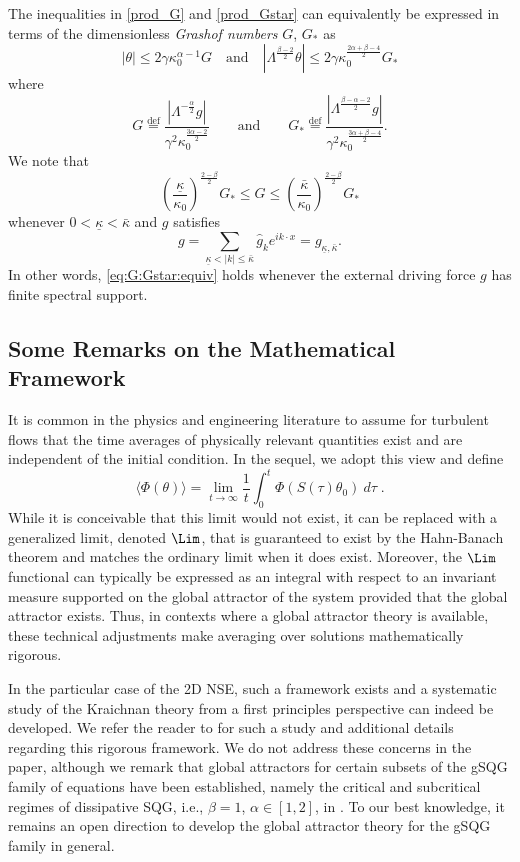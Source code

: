 \documentclass[twoside, reqno]{amsart}
\numberwithin{lemma}{section}
\numberwithin{theorem}{section}
\numberwithin{proposition}{section}
\numberwithin{equation}{section} %
\newcommand{\te}{\theta}
\newcommand{\ga}{\gamma}
\newcommand{\la}{\Lambda}
\newcommand{\bkap}{\bar{\kap}}
\newcommand{\kapb}{\underline{\kap}}
\newcommand{\al}{\alpha}
\newcommand{\be}{\beta}
\newcommand{\kap}{\kappa}
\begin{document}
The inequalities in \eqref{prod_G} and \eqref{prod_Gstar} can {equivalently} be expressed in terms of the dimensionless {\it Grashof numbers} $G$, ${G_*}$ as 
 $$|\te| \leq 2\ga\kappa_0^{\alpha-1}G \quad \text{and}\quad |\la^{\frac{\beta-2}{2}}\te| \leq {2}\ga \kappa_0^{\frac{2\alpha+\beta-4}{2}} G_*$$ where
    \begin{equation} \label{def:G}
        G \overset{\text{def}}{=} \frac{|\la^{-\frac{\alpha}{2}}g|}{\ga^2 \kappa_0^{\frac{3\alpha-2}{2}}} \qquad \text{and} \qquad G_* \overset{\text{def}}{=} \frac{|\la^{\frac{\beta-\alpha-2}{2}}g|}{\ga^2 \kappa_0^{\frac{3\alpha+\beta-4}{2}}} .
    \end{equation}
{We note that}
\begin{equation}\label{eq:G:Gstar:equiv}
    \left(\frac{\kapb}{\kappa_0}\right)^{\frac{2-\beta}{2}}  G_*\leq G \leq \left(\frac{\bkap}{\kappa_0}\right)^{\frac{2-\beta}{2}} G_* 
\end{equation}
whenever $0<\kapb<\bkap$ and $g$ satisfies 
\begin{equation} \label{def:g_kbound}
    g=\sum_{{\kapb} < |k| \leq \bkap} \hat{g}_k e^{ik\cdot x}=g_{\kapb,\bkap}.
\end{equation} 
{In other words, \eqref{eq:G:Gstar:equiv} holds whenever the external driving force $g$ has finite spectral support.}

\subsection{Some Remarks on the Mathematical Framework}
It is common in the physics and engineering literature to assume for turbulent flows that the time averages of physically relevant quantities exist and are independent of the initial condition.   In the sequel, we adopt this view and define 
$$
\langle \Phi(\theta) \rangle = \lim_{t\to \infty} \frac{1}{t} \int_0^t \Phi (S(\tau)\theta_0) \ d\tau\;.
$$
While it is conceivable that this limit would not exist, it can be replaced with a generalized limit, denoted $\Lim$, that is guaranteed to exist by the Hahn-Banach theorem and matches the ordinary limit when {it does exist}.  Moreover, the $\Lim$ {functional} can typically be expressed as an integral with respect to an invariant measure {supported on the global attractor of the system provided that the global attractor exists}. {Thus, in contexts where a global attractor theory is available}, these technical adjustments make averaging over solutions {mathematically} rigorous. 

{In the particular case of the 2D NSE, such a framework exists and a systematic study of the Kraichnan theory from a first principles perspective can indeed be developed. We refer the reader to \cite{FJMR2002} for such a study and additional details regarding this rigorous framework. We do not address these concerns in the paper, although we remark that global attractors for certain subsets of the gSQG family of equations have been established, namely the critical and subcritical regimes of dissipative SQG, i.e., $\be=1$, $\al\in[1,2]$, in \cite{NJ2005, ConstantinTarfuleaVicol2015}. To our best knowledge, it remains an open direction to develop the global attractor theory for the gSQG family in general.}
\end{document}
